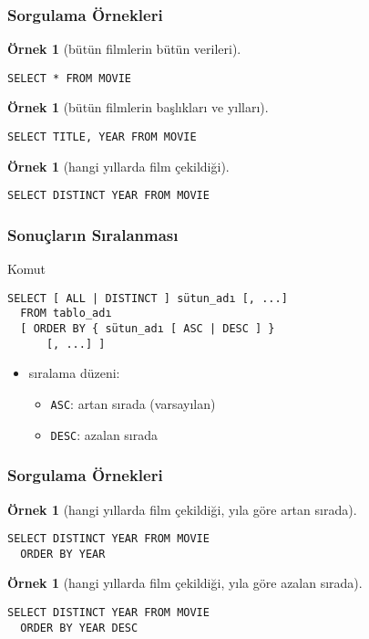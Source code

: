 \documentclass[dvipsnames]{beamer}
\theoremstyle{definition}
\theoremstyle{example}
\newtheorem{ornek}[theorem]{Örnek}
\theoremstyle{plain}
\begin{document}
\begin{frame}[fragile]
  \frametitle{Sorgulama Örnekleri}

  \begin{ornek}[bütün filmlerin bütün verileri]
    \begin{lstlisting}
SELECT * FROM MOVIE
    \end{lstlisting}
  \end{ornek}

  \pause
  \begin{ornek}[bütün filmlerin başlıkları ve yılları]
    \begin{lstlisting}
SELECT TITLE, YEAR FROM MOVIE
    \end{lstlisting}
  \end{ornek}

  \pause
  \begin{ornek}[hangi yıllarda film çekildiği]
    \begin{lstlisting}
SELECT DISTINCT YEAR FROM MOVIE
    \end{lstlisting}
  \end{ornek}
\end{frame}

\begin{frame}[fragile]
  \frametitle{Sonuçların Sıralanması}

  \begin{block}{Komut}
    \begin{lstlisting}
SELECT [ ALL | DISTINCT ] sütun_adı [, ...]
  FROM tablo_adı
  [ ORDER BY { sütun_adı [ ASC | DESC ] }
      [, ...] ]
    \end{lstlisting}
  \end{block}

  \pause
  \begin{itemize}
    \item sıralama düzeni:
    \begin{itemize}
      \item \lstinline!ASC!: artan sırada (varsayılan)
      \item \lstinline!DESC!: azalan sırada
    \end{itemize}
  \end{itemize}
\end{frame}

\begin{frame}[fragile]
  \frametitle{Sorgulama Örnekleri}

  \begin{ornek}[hangi yıllarda film çekildiği, yıla göre artan sırada]
    \begin{lstlisting}
SELECT DISTINCT YEAR FROM MOVIE
  ORDER BY YEAR
    \end{lstlisting}
  \end{ornek}

  \pause
  \begin{ornek}[hangi yıllarda film çekildiği, yıla göre azalan sırada]
    \begin{lstlisting}
SELECT DISTINCT YEAR FROM MOVIE
  ORDER BY YEAR DESC
    \end{lstlisting}
  \end{ornek}
\end{frame}
\end{document}
